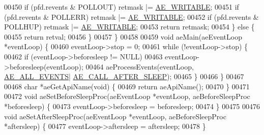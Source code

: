 \begin{DoxyCode}
00450         \textcolor{keywordflow}{if} (pfd.revents & POLLOUT) retmask |= \hyperlink{ae_8h_ab6bfb0366ccb6277112d132c2a2bf500}{AE\_WRITABLE};
00451     \textcolor{keywordflow}{if} (pfd.revents & POLLERR) retmask |= \hyperlink{ae_8h_ab6bfb0366ccb6277112d132c2a2bf500}{AE\_WRITABLE};
00452         \textcolor{keywordflow}{if} (pfd.revents & POLLHUP) retmask |= \hyperlink{ae_8h_ab6bfb0366ccb6277112d132c2a2bf500}{AE\_WRITABLE};
00453         \textcolor{keywordflow}{return} retmask;
00454     \} \textcolor{keywordflow}{else} \{
00455         \textcolor{keywordflow}{return} retval;
00456     \}
00457 \}
00458 
00459 \textcolor{keywordtype}{void} aeMain(aeEventLoop *eventLoop) \{
00460     eventLoop->stop = 0;
00461     \textcolor{keywordflow}{while} (!eventLoop->stop) \{
00462         \textcolor{keywordflow}{if} (eventLoop->beforesleep != NULL)
00463             eventLoop->beforesleep(eventLoop);
00464         aeProcessEvents(eventLoop, \hyperlink{ae_8h_a680280f52124f876adfeb7e81cb20264}{AE\_ALL\_EVENTS}|
      \hyperlink{ae_8h_a7fc929b2d363fc270b311f09d5048cca}{AE\_CALL\_AFTER\_SLEEP});
00465     \}
00466 \}
00467 
00468 \textcolor{keywordtype}{char} *aeGetApiName(\textcolor{keywordtype}{void}) \{
00469     \textcolor{keywordflow}{return} aeApiName();
00470 \}
00471 
00472 \textcolor{keywordtype}{void} aeSetBeforeSleepProc(aeEventLoop *eventLoop, aeBeforeSleepProc *beforesleep) \{
00473     eventLoop->beforesleep = beforesleep;
00474 \}
00475 
00476 \textcolor{keywordtype}{void} aeSetAfterSleepProc(aeEventLoop *eventLoop, aeBeforeSleepProc *aftersleep) \{
00477     eventLoop->aftersleep = aftersleep;
00478 \}
\end{DoxyCode}
